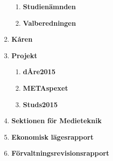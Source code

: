 \documentclass{dagordning}
\begin{document}
\begin{enumerate}
\begin{enumerate}
        \item \textbf{Studienämnden}
        \item \textbf{Valberedningen} 
      \end{enumerate}
    \item \textbf{Kåren}
    \item \textbf{Projekt}
      \begin{enumerate}
        \item \textbf{dÅre2015}
        \item \textbf{METAspexet}
        \item \textbf{Studs2015}
      \end{enumerate}
    \item \textbf{Sektionen för Medieteknik}
    \item \textbf{Ekonomisk lägesrapport}
    \item \textbf{Förvaltningsrevisionsrapport}
  \end{enumerate}








\end{document}
